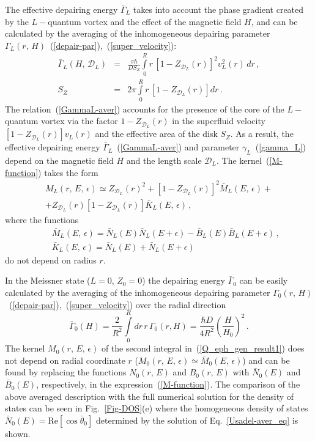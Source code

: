 \documentclass[prx,twocolumn,aps,superscriptaddress,showpacs,amsmath,amssymb,footnoteinbib]{revtex4-1}
\begin{document}
The effective depairing energy $\bar{\Gamma}_L$ takes into account
the phase gradient created by the $L-$quantum vortex and the
effect of the magnetic field $H$, and can be calculated by the
averaging of the inhomogeneous depairing parameter
$\Gamma_L(r,\,H)$~(\ref{depair-par}),~(\ref{super_velocity}):
%
\begin{eqnarray}\label{GammaL-aver}
    \bar{\Gamma}_L(H,\,\mathcal{D}_L) &=&
        \frac{\pi \hbar}{D S_Z} \int\limits_0^R r\, \left[ 1 - Z_{\mathcal{D}_L}(r) \right]^2 v_L^2(r)\, dr\,, \\
     S_Z &=& 2\pi \int\limits_0^R r\, \left[ 1 - Z_{\mathcal{D}_L}(r) \right] dr \,.\nonumber
\end{eqnarray}
%
The relation~(\ref{GammaL-aver}) accounts for the presence of the
core of the $L-$quantum vortex via the factor $1 -
Z_{\mathcal{D}_L}(r)$ in the superfluid velocity $\left[ 1 -
Z_{\mathcal{D}_L}(r) \right] v_L(r)$ and the effective area of the
disk $S_Z$. As a result, the effective depairing energy
$\bar{\Gamma}_L$~(\ref{GammaL-aver}) and parameter $\gamma_L$~(\ref{gamma_L}) depend on the magnetic field $H$ and the length
scale $\mathcal{D}_L$. The kernel~(\ref{M-function}) takes the
form
%
\begin{multline}
    M_L(r,\,E,\,\epsilon) \simeq Z_{\mathcal{D}_L}(r)^2 + \left[1 - Z_{\mathcal{D}_L}(r)\right]^2
    \bar{M}_L(E,\,\epsilon) + \\ + Z_{\mathcal{D}_L}(r)\left[1 - Z_{\mathcal{D}_L}(r)\right]
    \bar{K}_L(E,\,\epsilon) \,, \label{M-function-aver}
\end{multline}
%
where the functions
%
\begin{eqnarray}
&&\bar{M}_L(E,\,\epsilon) = \bar{N}_L(E) \bar{N}_L(E+\epsilon) - \bar{B}_L(E) \bar{B}_L(E+\epsilon)\,, \label{M-core-aver} \\
&&\bar{K}_L(E,\,\epsilon) = \bar{N}_L(E) + \bar{N}_L(E+\epsilon)\,
\label{K-core-aver}
\end{eqnarray}
%
do not depend on radius $r$.

In the Meissner state ($L = 0$, $Z_0 = 0$) the depairing energy
$\bar{\Gamma}_0$ can be easily calculated by the averaging of the
inhomogeneous depairing parameter $\Gamma_0(r,\,H)$~(\ref{depair-par}),~(\ref{super_velocity}) over the radial
direction
%
\begin{equation}\label{Gamma0-aver}
    \bar{\Gamma}_0(H) = \frac{2}{R^2} \int\limits_0^R dr\, r\, \Gamma_0(r, H) =
        \frac{\hbar D}{4 R^2} \left(\frac{H}{H_0}\right)^2\,.
\end{equation}
%
The kernel $M_0(r,\,E,\,\epsilon)$ of the second integral
in~(\ref{Q_eph_gen_result1}) does not depend on radial coordinate
$r$ ($ M_0(r,\,E,\,\epsilon) \simeq \bar{M}_0(E,\,\epsilon)$) and
can be found by replacing the functions $N_0(r,\,E)$ and
$B_0(r,\,E)$ with $\bar{N}_0(E)$ and $\bar{B}_0(E)$, respectively,
in the expression~(\ref{M-function}). The comparison of the above
averaged description with the full numerical solution for the
density of states can be seen in Fig.~\ref{Fig-DOS}(e) where the
homogeneous density of states $\bar{N}_0(E) =
\mathrm{Re}[\cos\bar{\theta}_0]$ determined by the solution of
Eq.~\eqref{Usadel-aver_eq} is shown.
\end{document}
